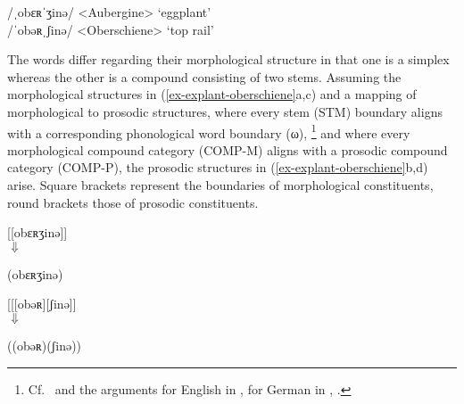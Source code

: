 \documentclass[output=paper
 ,nobabel
 ,draftmode
 ,colorlinks, citecolor=brown
]{langscibook}
\begin{document}
/ˌobɛʀˈʒinə/ <Aubergine>    `eggplant'\\

\ex\label{ex-oberschiene}
/ˈobəʀˌʃinə/ <Oberschiene> `top rail'
\zl

\largerpage
\noindent
The words differ regarding their morphological structure in that one is a simplex whereas the other is a compound consisting of two stems. Assuming the morphological structures in (\ref{ex-explant-oberschiene}a,c) and a mapping of morphological to prosodic structures, where every stem (STM) boundary aligns with a corresponding phonological word boundary (ω),%
%
\footnote{Cf.\ \citet{NesporVogel2007} and the arguments for English in \citet{Raffelsiefen1999},
  for German in \citet[cf.\ footnote 12]{Wiese2000}, \citet{Raffelsiefen2000}.} and where every
morphological compound category (COMP-M) aligns with a prosodic compound category (COMP-P), the
prosodic structures in (\ref{ex-explant-oberschiene}b,d) arise. Square brackets represent the
boundaries of morphological constituents, round brackets those of prosodic constituents. 

\ea
\label{ex-explant-oberschiene}
\begin{multicols}{2}
\ea\label{ex-eggplant-stm}
[[obɛʀʒinə]]\\

\hphantom{[[obɛ}$\Downarrow$

\ex\label{ex-eggplant-comp}
(obɛʀʒinə)

\columnbreak

\ex\label{ex-oberschiene-stm}
[[[obəʀ][ʃinə]]\\

\hphantom{[[[obəʀ]\sub{STM}}$\Downarrow$

\ex\label{ex-oberschiene-comp}
((obəʀ)(ʃinə))
\z
	
\end{multicols}
\z
\end{document}
